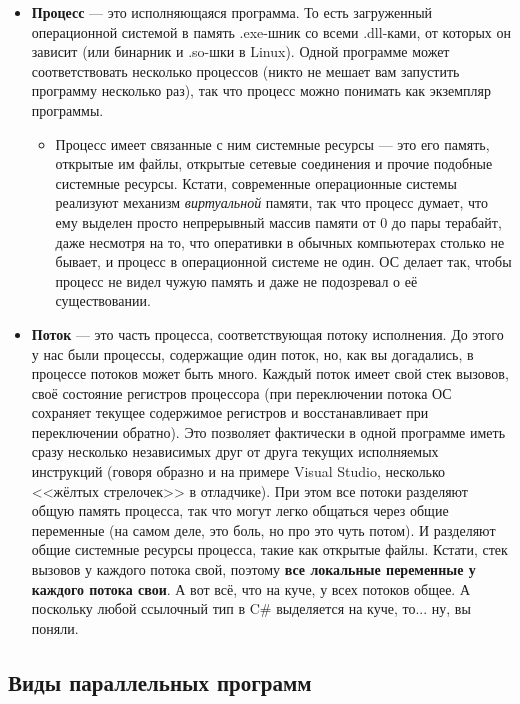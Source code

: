\documentclass[a5paper]{article}
\begin{document}
\begin{itemize}
    \item \textbf{Процесс} --- это исполняющаяся программа. То есть загруженный операционной системой в память .exe-шник со всеми .dll-ками, от которых он зависит (или бинарник и .so-шки в Linux). Одной программе может соответствовать несколько процессов (никто не мешает вам запустить программу несколько раз), так что процесс можно понимать как экземпляр программы.
    \begin{itemize}
        \item Процесс имеет связанные с ним системные ресурсы --- это его память, открытые им файлы, открытые сетевые соединения и прочие подобные системные ресурсы. Кстати, современные операционные системы реализуют механизм \textit{виртуальной} памяти, так что процесс думает, что ему выделен просто непрерывный массив памяти от 0 до пары терабайт, даже несмотря на то, что оперативки в обычных компьютерах столько не бывает, и процесс в операционной системе не один. ОС делает так, чтобы процесс не видел чужую память и даже не подозревал о её существовании.
    \end{itemize}
    \item \textbf{Поток} --- это часть процесса, соответствующая потоку исполнения. До этого у нас были процессы, содержащие один поток, но, как вы догадались, в процессе потоков может быть много. Каждый поток имеет свой стек вызовов, своё состояние регистров процессора (при переключении потока ОС сохраняет текущее содержимое регистров и восстанавливает при переключении обратно). Это позволяет фактически в одной программе иметь сразу несколько независимых друг от друга текущих исполняемых инструкций (говоря образно и на примере Visual Studio, несколько <<жёлтых стрелочек>> в отладчике). При этом все потоки разделяют общую память процесса, так что могут легко общаться через общие переменные (на самом деле, это боль, но про это чуть потом). И разделяют общие системные ресурсы процесса, такие как открытые файлы. Кстати, стек вызовов у каждого потока свой, поэтому \textbf{все локальные переменные у каждого потока свои}. А вот всё, что на куче, у всех потоков общее. А поскольку любой ссылочный тип в C\# выделяется на куче, то... ну, вы поняли.
\end{itemize}

\subsection{Виды параллельных программ}
\end{document}
